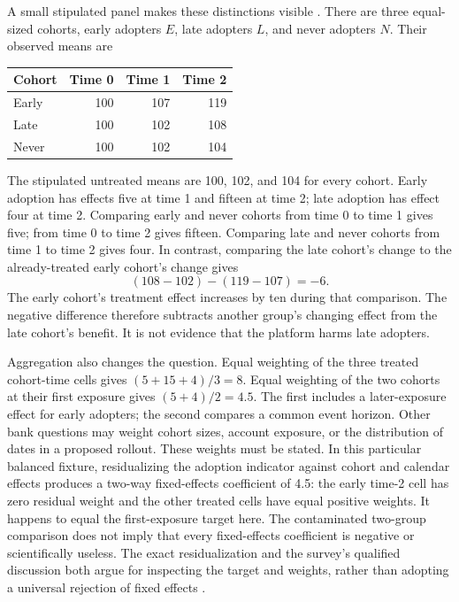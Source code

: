 A small stipulated panel makes these distinctions visible
\cite{exec14_workflow_oracle}. There are three equal-sized cohorts, early
adopters $E$, late adopters $L$, and never adopters $N$. Their observed means are
\begin{center}
\begin{tabular}{lrrr}
\toprule
Cohort & Time 0 & Time 1 & Time 2\\
\midrule
Early &100&107&119\\
Late &100&102&108\\
Never &100&102&104\\
\bottomrule
\end{tabular}
\end{center}
The stipulated untreated means are 100, 102, and 104 for every cohort.
Early adoption has effects five at time 1 and fifteen at time 2; late adoption
has effect four at time 2. Comparing early and never cohorts from time 0 to
time 1 gives five; from time 0 to time 2 gives fifteen. Comparing late and
never cohorts from time 1 to time 2 gives four. In contrast, comparing the
late cohort's change to the already-treated early cohort's change gives
\[
 (108-102)-(119-107)=-6.
\]
The early cohort's treatment effect increases by ten during that comparison.
The negative difference therefore subtracts another group's changing effect
from the late cohort's benefit. It is not evidence that the platform harms
late adopters.

Aggregation also changes the question. Equal weighting of the three treated
cohort-time cells gives $(5+15+4)/3=8$. Equal weighting of the two cohorts at
their first exposure gives $(5+4)/2=4.5$. The first includes a later-exposure
effect for early adopters; the second compares a common event horizon. Other
bank questions may weight cohort sizes, account exposure, or the distribution
of dates in a proposed rollout. These weights must be stated. In this particular
balanced fixture, residualizing the adoption indicator against cohort and
calendar effects produces a two-way fixed-effects coefficient of 4.5: the
early time-2 cell has zero residual weight and the other treated cells have
equal positive weights. It happens to equal the first-exposure target here.
The contaminated two-group comparison does not imply that every fixed-effects
coefficient is negative or scientifically useless. The exact residualization
and the survey's qualified discussion both argue for inspecting the target and
weights, rather than adopting a universal rejection of fixed effects
\cite{panelreview2024,exec14_workflow_oracle}.


